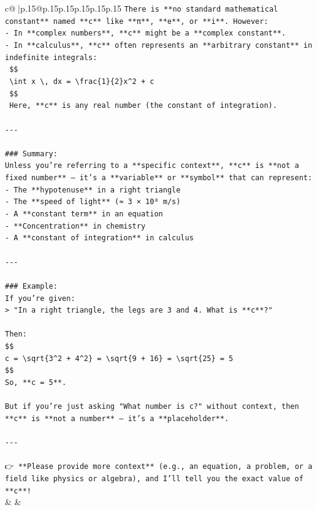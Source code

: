 \documentclass{article}
\begin{document}
{\begin{supertabular}{c@{$\;$}|p{.15\linewidth}@{}p{.15\linewidth}p{.15\linewidth}p{.15\linewidth}p{.15\linewidth}p{.15\linewidth}}
{{{\texttt{There is **no standard mathematical constant** named **c** like **π**, **e**, or **i**. However:} \\
\texttt{{-} In **complex numbers**, **c** might be a **complex constant**.} \\
\texttt{{-} In **calculus**, **c** often represents an **arbitrary constant** in indefinite integrals:} \\
\texttt{  \$\$} \\
\texttt{  \textbackslash{}int x \textbackslash{}, dx = \textbackslash{}frac\{1\}\{2\}x\^{}2 + c} \\
\texttt{  \$\$} \\
\texttt{  Here, **c** is any real number (the constant of integration).} \\
\\ 
\texttt{{-}{-}{-}} \\
\\ 
\texttt{\#\#\# Summary:} \\
\texttt{Unless you're referring to a **specific context**, **c** is **not a fixed number** — it's a **variable** or **symbol** that can represent:} \\
\texttt{{-} The **hypotenuse** in a right triangle} \\
\texttt{{-} The **speed of light** (≈ 3 × 10⁸ m/s)} \\
\texttt{{-} A **constant term** in an equation} \\
\texttt{{-} **Concentration** in chemistry} \\
\texttt{{-} A **constant of integration** in calculus} \\
\\ 
\texttt{{-}{-}{-}} \\
\\ 
\texttt{\#\#\# Example:} \\
\texttt{If you're given:} \\
\texttt{> "In a right triangle, the legs are 3 and 4. What is **c**?"} \\
\\ 
\texttt{Then:} \\
\texttt{\$\$} \\
\texttt{c = \textbackslash{}sqrt\{3\^{}2 + 4\^{}2\} = \textbackslash{}sqrt\{9 + 16\} = \textbackslash{}sqrt\{25\} = 5} \\
\texttt{\$\$} \\
\texttt{So, **c = 5**.} \\
\\ 
\texttt{But if you're just asking "What number is c?" without context, then **c** is **not a number** — it's a **placeholder**.} \\
\\ 
\texttt{{-}{-}{-}} \\
\\ 
\texttt{👉 **Please provide more context** (e.g., an equation, a problem, or a field like physics or algebra), and I’ll tell you the exact value of **c**!} \\
            }
        }
    }
    & & \\ \\


\end{supertabular}}
\end{document}
